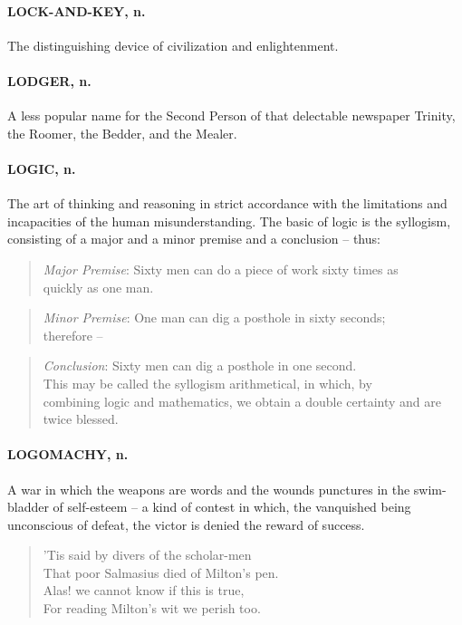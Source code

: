 \documentclass[11pt]{article}
\begin{document}
\paragraph{LOCK-AND-KEY, n.}  The distinguishing device of civilization and
enlightenment.

\paragraph{LODGER, n.}  A less popular name for the Second Person of that
delectable newspaper Trinity, the Roomer, the Bedder, and the Mealer.

\paragraph{LOGIC, n.}  The art of thinking and reasoning in strict accordance with
the limitations and incapacities of the human misunderstanding.  The
basic of logic is the syllogism, consisting of a major and a minor
premise and a conclusion -- thus:
\begin{quote}   {\em Major Premise}:  Sixty men can do a piece of work sixty times as \\
quickly as one man. \end{quote}
\begin{quote}   {\em Minor Premise}:  One man can dig a posthole in sixty seconds; \\
therefore -- \end{quote}
\begin{quote}   {\em Conclusion}:  Sixty men can dig a posthole in one second. \\
  This may be called the syllogism arithmetical, in which, by \\
combining logic and mathematics, we obtain a double certainty and are \\
twice blessed.  \end{quote}

\paragraph{LOGOMACHY, n.}  A war in which the weapons are words and the wounds
punctures in the swim-bladder of self-esteem -- a kind of contest in
which, the vanquished being unconscious of defeat, the victor is
denied the reward of success.

\begin{quote}   'Tis said by divers of the scholar-men \\
  That poor Salmasius died of Milton's pen. \\
  Alas! we cannot know if this is true, \\
  For reading Milton's wit we perish too.  \end{quote}
\end{document}
